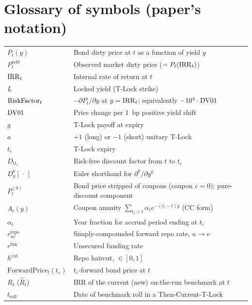 \documentclass[11pt,a4paper]{article}
\begin{document}
\section{Glossary of symbols (paper's notation)}

\begin{tabular}{@{}p{3cm}p{12cm}@{}}
\toprule
$P_t(y)$        & Bond dirty price at $t$ as a function of yield $y$ \\
$P_t^{mkt}$     & Observed market dirty price ($= P_t(\mathrm{IRR}_t)$) \\
$\mathrm{IRR}_t$        & Internal rate of return at $t$ \\
$L$             & Locked yield (T-Lock strike) \\
$\mathrm{RiskFactor}_t$      & $-\partial P_t/\partial y$ at $y=\mathrm{IRR}_t$; equivalently $-10^4 \cdot \mathrm{DV01}$ \\
$\mathrm{DV01}$        & Price change per 1~bp positive yield shift \\
$g$             & T-Lock payoff at expiry \\
$a$             & $+1$ (long) or $-1$ (short) unitary T-Lock \\
$t_e$           & T-Lock expiry \\
$D_{tt_e}$      & Risk-free discount factor from $t$ to $t_e$ \\
$D_y^k[\,\cdot\,]$ & Euler shorthand for $\partial^k/\partial y^k$ \\
$P_t^{(0)}$     & Bond price stripped of coupons (coupon $c=0$); pure-discount component \\
$A_t(y)$        & Coupon annuity $\sum_{t_i>t} \alpha_i e^{-(t_i-t)y}$ (CC form) \\
$\alpha_i$      & Year fraction for accrual period ending at $t_i$ \\
$r^{\mathrm{repo}}_{uv}$ & Simply-compounded forward repo rate, $u \to v$ \\
$r^{\mathrm{fun}}$ & Unsecured funding rate \\
$h^{\mathrm{cut}}$ & Repo haircut, $\in [0,1]$ \\
$\mathrm{ForwardPrice}_t(t_e)$ & $t_e$-forward bond price at $t$ \\
$R_t$ ($\widehat{R}_t$) & IRR of the current (new) on-the-run benchmark at $t$ \\
$t_{\mathrm{roll}}$ & Date of benchmark roll in a Then-Current-T-Lock \\
\bottomrule
\end{tabular}
\end{document}
